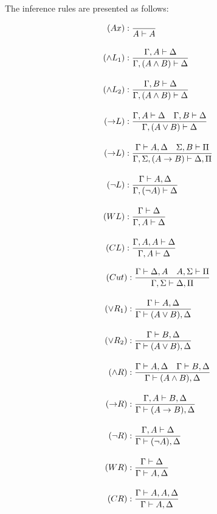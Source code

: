 The inference rules are presented as follows:
\vspace{-11pt}
\begin{center}
    \derivationfont
    \begin{minipage}{.4\textwidth}
        \begin{align*}
            (Ax) &: \frac{}{A \vdash A} \\[1em]
            (\land L_1) &: \frac{\Gamma, A \vdash \Delta}{\Gamma, (A \land B) \vdash \Delta} \\[1em]
            (\land L_2) &: \frac{\Gamma, B \vdash \Delta}{\Gamma, (A \land B) \vdash \Delta} \\[1em]
            (\mathord{\to} L) &: \frac{\Gamma, A \vdash \Delta \quad \Gamma, B \vdash \Delta}{\Gamma, (A \lor B) \vdash \Delta} \\[1em]
            (\mathord{\to} L) &: \frac{\Gamma \vdash A, \Delta \quad \Sigma, B \vdash \Pi}{\Gamma, \Sigma, (A \to B) \vdash \Delta, \Pi} \\[1em]
            (\lnot L) &: \frac{\Gamma \vdash A, \Delta}{\Gamma, (\lnot A) \vdash \Delta} \\[1em]
            (WL) &: \frac{\Gamma \vdash \Delta}{\Gamma, A \vdash \Delta} \\[1em]
            (CL) &: \frac{\Gamma, A, A \vdash \Delta}{\Gamma, A \vdash \Delta}
        \end{align*}
    \end{minipage}%
    \begin{minipage}{.4\textwidth}
        \begin{align*}
            (Cut) &: \frac{\Gamma \vdash \Delta, A \quad A, \Sigma \vdash \Pi}{\Gamma, \Sigma \vdash \Delta, \Pi} \\[1em]
            (\lor R_1) &: \frac{\Gamma \vdash A, \Delta}{\Gamma \vdash (A \lor B), \Delta} \\[1em]
            (\lor R_2) &: \frac{\Gamma \vdash B, \Delta}{\Gamma \vdash (A \lor B), \Delta} \\[1em]
            (\land R) &: \frac{\Gamma \vdash A, \Delta \quad \Gamma \vdash B, \Delta}{\Gamma \vdash (A \land B), \Delta} \\[1em]
            (\mathord{\to} R) &: \frac{\Gamma, A \vdash B, \Delta}{\Gamma \vdash (A \to B), \Delta} \\[1em]
            (\lnot R) &: \frac{\Gamma, A \vdash \Delta}{\Gamma \vdash (\lnot A), \Delta} \\[1em]
            (WR) &: \frac{\Gamma \vdash \Delta}{\Gamma \vdash A, \Delta} \\[1em]
            (CR) &: \frac{\Gamma \vdash A, A, \Delta}{\Gamma \vdash A, \Delta}
        \end{align*}
    \end{minipage}
\end{center}
